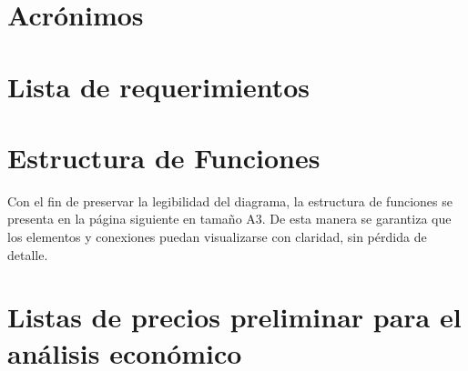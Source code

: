 \appendix
\chapter{Acr\'onimos}
\label{an:Annex_A_Acronimos}
    
\cleardoublepage 
\chapter{Lista de requerimientos}
\label{an:Annex_B_TablaVariables}

\cleardoublepage



\chapter{Estructura de Funciones}
\label{an:Annex_estrucutra}
Con el fin de preservar la legibilidad del diagrama, la estructura de funciones se presenta en la página siguiente en tamaño A3. De esta manera se garantiza que los elementos y conexiones puedan visualizarse con claridad, sin pérdida de detalle.

\clearpage 





\chapter{Listas de precios preliminar para el análisis económico}
\label{an:Annex_D_precios_preliminares}

\cleardoublepage
%     
%
%
